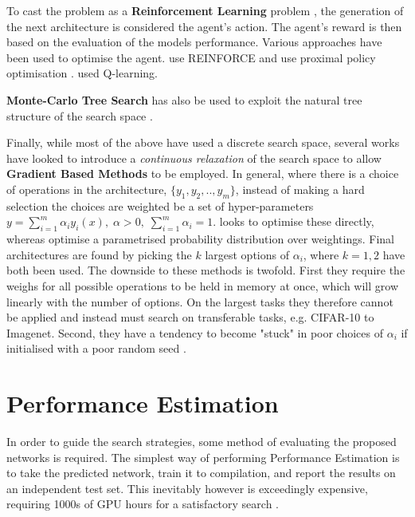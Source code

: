 To cast the problem as a \textbf{Reinforcement Learning} problem \citep{Baker2016,zoph2016neural,zoph2018learning,zhong2017practical}, the generation of the next architecture is considered the agent's action. The agent's reward is then based on the evaluation of the models performance. Various approaches have been used to optimise the agent. \citet{zoph2016neural} use REINFORCE \citep{williams1992simple} and \citep{zoph2018learning} use proximal policy optimisation \citep{Schulman2017}. \citet{Baker2016} used Q-learning.

\textbf{Monte-Carlo Tree Search} has also be used to exploit the natural tree structure of the search space \citep{negrinho2017deeparchitect, Wistuba, Elsken2018}.

Finally, while most of the above have used a discrete search space, several works have looked to introduce a \textit{continuous relaxation} of the search space to allow \textbf{Gradient Based Methods} to be employed. In general, where there is a choice of operations in the architecture, \( \{ y_1, y_2,.., y_m\} \), instead of making a hard selection the choices are weighted be a set of hyper-parameters \( y = \sum_{i=1}^{m} \alpha_i y_i(x), \; \alpha >0, \; \sum_{i=1}^{m} \alpha_i = 1\). \citet{liu2018darts} looks to optimise these directly, whereas \citet{Xie2018,Cai2018} optimise a parametrised probability distribution over weightings. Final architectures are found by picking the \( k \) largest options of \( \alpha_i \), where \( k=1,2 \) have both been used. The downside to these methods is twofold. First they require the weighs for all possible operations to be held in memory at once, which will grow linearly with the number of options. On the largest tasks they therefore cannot be applied and instead must search on transferable tasks, e.g. CIFAR-10 to Imagenet. Second, they have a tendency to become "stuck" in poor choices of \( \alpha_i \) if initialised with a poor random seed \citep{liu2018darts}.

\section{Performance Estimation}

In order to guide the search strategies, some method of evaluating the proposed networks is required. The simplest way of performing Performance Estimation is to take the predicted network, train it to compilation, and report the results on an independent test set. This inevitably however is exceedingly expensive, requiring 1000s of GPU hours for a satisfactory search \citep{zoph2016neural,zoph2018learning,real2017large,Real}.

